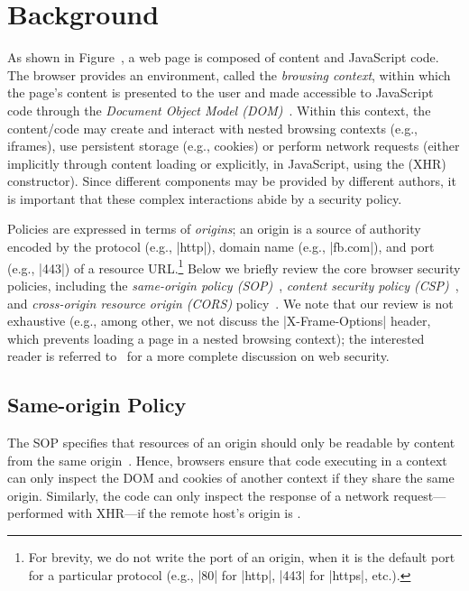 \section{Background}
\label{sec:background}

%
As shown in Figure~, a web page is composed of
content and JavaScript code.
%
The browser provides an environment, called the \emph{browsing
context}, within which the page's content is presented to the user and
made accessible to JavaScript code through the \emph{Document Object
Model (DOM)}~.
%
Within this context, the content/code may create and interact with
nested browsing contexts (e.g., iframes), use persistent storage
(e.g., cookies) or perform network requests (either implicitly through
content loading or explicitly, in JavaScript, using the \xhr{} (XHR)
constructor).
%
Since different components may be provided by different authors, it is
important that these complex interactions abide by a security policy.
 
Policies are expressed in terms of \emph{origins}; an origin is a
source of authority encoded by the protocol (e.g., \js|http|), domain
name (e.g., \js|fb.com|), and port (e.g., \js|443|) of a resource
URL.\footnote{
  For brevity, we do not write the port of an origin, when it is the
  default port for a particular protocol (e.g., \js|80| for \js|http|,
  \js|443| for \js|https|, etc.).
}
%
Below we briefly review the core browser security policies, including
the \emph{same-origin policy (SOP)}~\tocite{}, \emph{content security
policy (CSP)}~\tocite{}, and \emph{cross-origin resource origin
(CORS)} policy~\tocite{}.
%
%
We note that our review is not exhaustive (e.g., among other, we not
discuss the \js|X-Frame-Options| header, which prevents loading a page
in a nested browsing context);  the interested reader is referred
to~\tocite{} for a more complete discussion on web security.



\subsection{Same-origin Policy}
\label{sec:background:sop}

The SOP specifies that resources of an origin should only be readable
by content from the same origin~.
%
Hence, browsers ensure that code executing in a  context
can only inspect the DOM and cookies of another context if they share
the same origin.
%
Similarly, the code can only inspect the response of a network
request---performed with XHR---if the remote host's origin is
.
%
 
